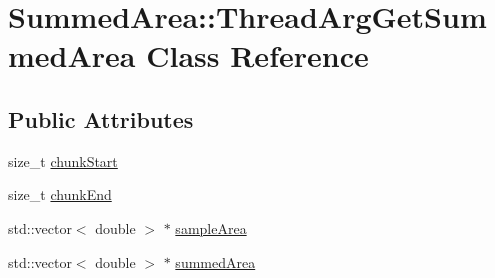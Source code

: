 \hypertarget{classSummedArea_1_1ThreadArgGetSummedArea}{\section{Summed\-Area\-:\-:Thread\-Arg\-Get\-Summed\-Area Class Reference}
\label{classSummedArea_1_1ThreadArgGetSummedArea}
}
\subsection*{Public Attributes}
\begin{DoxyCompactItemize}
\item 
size\-\_\-t \hyperlink{classSummedArea_1_1ThreadArgGetSummedArea_a6b09db7eb9a63d224a6a30ff3ddda5a9}{chunk\-Start}
\item 
size\-\_\-t \hyperlink{classSummedArea_1_1ThreadArgGetSummedArea_a2d54148cc8b8339f10d09788c023c20a}{chunk\-End}
\item 
std\-::vector$<$ double $>$ $\ast$ \hyperlink{classSummedArea_1_1ThreadArgGetSummedArea_a259ec50cc8a157c409e607ef0cc985a7}{sample\-Area}
\item 
std\-::vector$<$ double $>$ $\ast$ \hyperlink{classSummedArea_1_1ThreadArgGetSummedArea_a1d372c5cf76441376dc475005c904ecb}{summed\-Area}
\end{DoxyCompactItemize}


